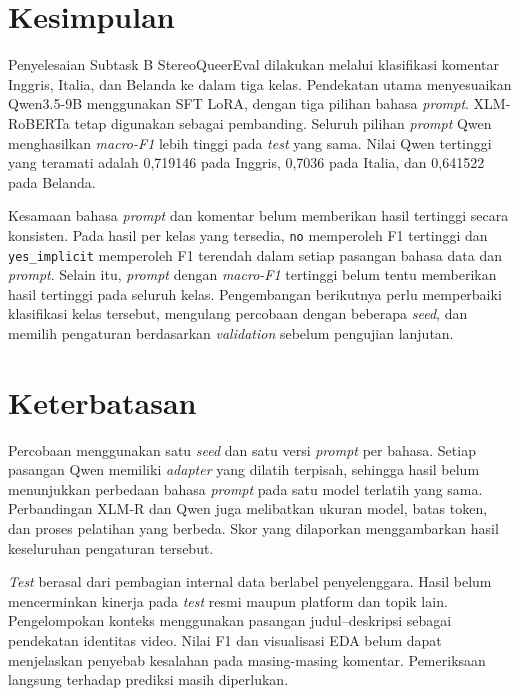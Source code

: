 \documentclass[11pt]{article}
\begin{document}
\section{Kesimpulan}
Penyelesaian Subtask B StereoQueerEval dilakukan melalui klasifikasi komentar Inggris, Italia, dan Belanda ke dalam tiga kelas. Pendekatan utama menyesuaikan Qwen3.5-9B menggunakan SFT LoRA, dengan tiga pilihan bahasa \textit{prompt}. XLM-RoBERTa tetap digunakan sebagai pembanding. Seluruh pilihan \textit{prompt} Qwen menghasilkan \textit{macro-F1} lebih tinggi pada \textit{test} yang sama. Nilai Qwen tertinggi yang teramati adalah 0,719146 pada Inggris, 0,7036 pada Italia, dan 0,641522 pada Belanda.

Kesamaan bahasa \textit{prompt} dan komentar belum memberikan hasil tertinggi secara konsisten. Pada hasil per kelas yang tersedia, \texttt{no} memperoleh F1 tertinggi dan \texttt{yes\_implicit} memperoleh F1 terendah dalam setiap pasangan bahasa data dan \textit{prompt}. Selain itu, \textit{prompt} dengan \textit{macro-F1} tertinggi belum tentu memberikan hasil tertinggi pada seluruh kelas. Pengembangan berikutnya perlu memperbaiki klasifikasi kelas tersebut, mengulang percobaan dengan beberapa \textit{seed}, dan memilih pengaturan berdasarkan \textit{validation} sebelum pengujian lanjutan.

\section*{Keterbatasan}
Percobaan menggunakan satu \textit{seed} dan satu versi \textit{prompt} per bahasa. Setiap pasangan Qwen memiliki \textit{adapter} yang dilatih terpisah, sehingga hasil belum menunjukkan perbedaan bahasa \textit{prompt} pada satu model terlatih yang sama. Perbandingan XLM-R dan Qwen juga melibatkan ukuran model, batas token, dan proses pelatihan yang berbeda. Skor yang dilaporkan menggambarkan hasil keseluruhan pengaturan tersebut.

\textit{Test} berasal dari pembagian internal data berlabel penyelenggara. Hasil belum mencerminkan kinerja pada \textit{test} resmi maupun platform dan topik lain. Pengelompokan konteks menggunakan pasangan judul--deskripsi sebagai pendekatan identitas video. Nilai F1 dan visualisasi EDA belum dapat menjelaskan penyebab kesalahan pada masing-masing komentar. Pemeriksaan langsung terhadap prediksi masih diperlukan.


\end{document}
